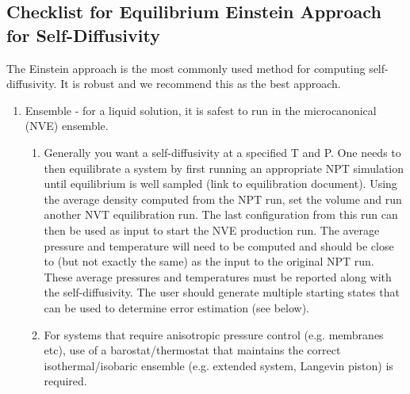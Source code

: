 \documentclass[9pt]{livecoms}
\begin{document}
\subsection{Checklist for Equilibrium Einstein Approach for Self-Diffusivity}


The Einstein approach is the most commonly used method for computing self-diffusivity. It is robust and we recommend this as the best approach.

\begin{enumerate}
	\item Ensemble - for a liquid solution, it is safest to run in the microcanonical (NVE) ensemble. %
	\begin{enumerate}
		\item Generally you want a self-diffusivity at a specified T and P. One needs to then equilibrate a system by first running an appropriate NPT simulation until equilibrium is well sampled (link to equilibration document). Using the average density computed from the NPT run, set the volume and run another NVT equilibration run. The last configuration from this run can then be used as input to start the NVE production run. The average pressure and temperature will need to be computed and should be close to (but not exactly the same) as the input to the original NPT run. These average pressures and temperatures must be reported along with the self-diffusivity. The user should generate multiple starting states that can be used to determine error estimation (see below).
		\item For systems that require anisotropic pressure control (e.g. membranes etc), use of a barostat/thermostat that maintains the correct isothermal/isobaric ensemble (e.g. extended system, Langevin piston) is required.

\end{enumerate}
\end{enumerate}
\end{document}
